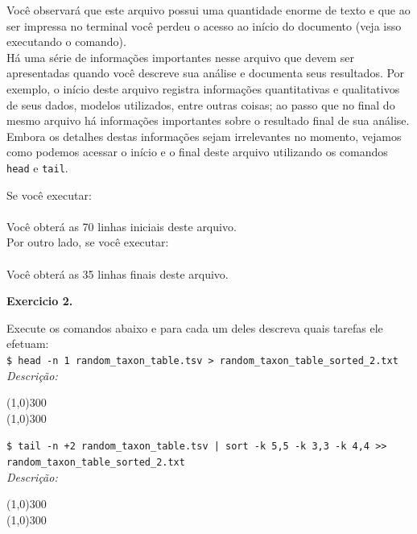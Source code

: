 \begin{refsection}
Você observará que este arquivo possui uma quantidade enorme de texto e que ao ser impressa no terminal você perdeu o acesso ao início do documento (veja isso executando o comando).\\
Há uma série de informações importantes nesse arquivo que devem ser apresentadas quando você descreve sua análise e documenta seus resultados. Por exemplo, o início deste arquivo registra informações quantitativas e qualitativos de seus dados, modelos utilizados, entre outras coisas; ao passo que no final do mesmo arquivo há informações importantes sobre o resultado final de sua análise. Embora os detalhes destas informações sejam irrelevantes no momento, vejamos como podemos acessar o início e o final deste arquivo utilizando os comandos \texttt{head} e \texttt{tail}.

Se você executar:\\
\\

Você obterá as 70 linhas iniciais deste arquivo.\\

Por outro lado, se você executar:\\
\\

Você obterá as 35 linhas finais deste arquivo.\\

\begin{blackBlock}{\textbf{Exercicio 2.}}\label{tut2:ex:2.\arabic{ex}}

Execute os comandos abaixo e para cada um deles descreva quais tarefas ele efetuam:\\
 
\small{\texttt{\$ head -n 1 random\_taxon\_table.tsv > random\_taxon\_table\_sorted\_2.txt}}\\

\textit{Descrição:}
\begin{center}
\line(1,0){300}\\
\line(1,0){300}\\
\end{center}

\texttt{\$ tail -n +2 random\_taxon\_table.tsv | sort -k 5,5 -k 3,3 -k 4,4 >> random\_taxon\_table\_sorted\_2.txt}
\\
\textit{Descrição:}
\begin{center}
\line(1,0){300}\\
\line(1,0){300}\\
\end{center}


\end{blackBlock}
\end{refsection}
